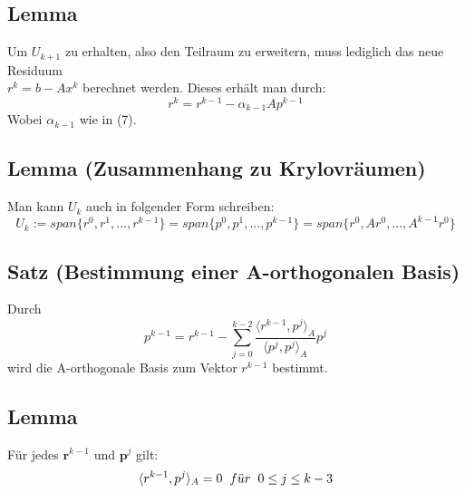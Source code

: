 \documentclass{article}
\begin{document}
\subsection{Lemma}
Um $U_{k+1}$ zu erhalten, also den Teilraum zu erweitern, muss lediglich das neue Residuum \\$r^{k} = b - Ax^{k}$ berechnet werden. Dieses erhält man durch:
\begin{equation}
r^{k} = r^{k-1} - \alpha_{k-1}Ap^{k-1}
\end{equation}
Wobei $\alpha_{k-1}$ wie in (7).

\subsection{Lemma (Zusammenhang zu Krylovräumen)}
Man kann $U_{k}$ auch in folgender Form schreiben:
\begin{equation}
U_{k} := span\{r^{0}, r^{1},...,r^{k-1}\} = span\{p^{0},p^{1},...,p^{k-1}\} = span\{r^{0}, Ar^{0},...,A^{k-1}r^{0}\}
\end{equation}

\subsection{Satz (Bestimmung einer A-orthogonalen Basis)}
Durch
\begin{equation}
p^{k-1} = r^{k-1} - \sum_{j=0}^{k-2} \frac {\langle r^{k-1}, p^{j} \rangle _{A}} {\langle p^{j}, p^{j} \rangle _{A}} p^{j}
\end{equation}
wird die A-orthogonale Basis zum Vektor $r^{k-1}$ bestimmt.

\subsection{Lemma}
Für jedes $\textbf{r}^{k-1}$ und $\textbf{p}^{j}$ gilt:
\begin{equation*}
\langle r^{k-1}, p^{j} \rangle _{A} = 0 \hspace{2mm} f\ddot{u}r \hspace{2mm} 0 \le j \le k-3
\end{equation*}

\end{document}
